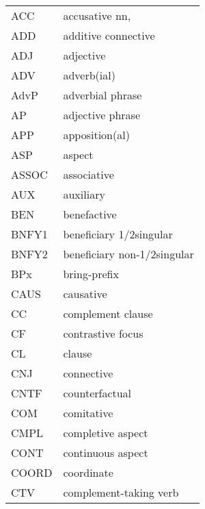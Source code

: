 \begin{tabular}{ll}
ACC & accusative nn, \\
ADD & additive connective \\
ADJ & adjective \\
ADV & adverb(ial) \\
AdvP & adverbial phrase \\
AP & adjective phrase \\
APP & apposition(al) \\
ASP & aspect \\
ASSOC & associative \\
AUX & auxiliary \\
BEN & benefactive \\
BNFY1 & beneficiary 1/2singular \\
BNFY2 & beneficiary non-1/2singular \\
BPx & bring-prefix \\
CAUS & causative \\
CC & complement clause \\
CF & contrastive focus \\
CL & clause \\
CNJ & connective \\
CNTF & counterfactual \\
COM & comitative \\
CMPL & completive aspect \\
CONT & continuous aspect \\
COORD & coordinate \\
CTV & complement-taking verb \\
\end{tabular}


